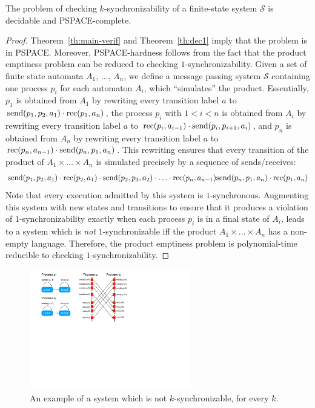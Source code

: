 \begin{theorem}
The problem of checking $k$-synchronizability of a finite-state system $\mathcal{S}$ is decidable and PSPACE-complete.
\end{theorem}
\begin{proof}
Theorem~\ref{th:main-verif} and Theorem~\ref{th:dec1} imply that the problem is in PSPACE. Moreover, PSPACE-hardness follows from the fact that the product emptiness problem can be reduced to checking $1$-synchronizability. Given a set of finite state automata $A_1$, $\ldots$, $A_n$, we define a message passing system $\mathcal{S}$ containing one process $p_i$ for each automaton $A_i$, which ``simulates'' the product. Essentially, $p_1$ is obtained from $A_1$ by rewriting every transition label $a$ to $\mathrm{send}({p_1,p_2,a_1})\cdot \mathrm{rec}({p_1,a_n})$, the process $p_i$ with $1<i<n$ is obtained from $A_i$ by rewriting every transition label $a$ to $\mathrm{rec}({p_i,a_{i-1}})\cdot \mathrm{send}({p_i,p_{i+1},a_i})$, and $p_n$ is obtained from $A_n$ by rewriting every transition label $a$ to $\mathrm{rec}({p_n,a_{n-1}})\cdot \mathrm{send}({p_n,p_1,a_n})$. This rewriting ensures that every transition of the product of $A_1\times\ldots\times A_n$ is simulated precisely by a sequence of sends/receives:
\begin{align*}
\mathrm{send}({p_1,p_2,a_1})\cdot \mathrm{rec}({p_2,a_1})\cdot \mathrm{send}({p_2,p_3,a_2})\cdot\ldots \cdot \mathrm{rec}({p_n,a_{n-1}}) \mathrm{send}({p_n,p_1,a_n})\cdot \mathrm{rec}({p_1,a_n})
\end{align*}
Note that every execution admitted by this system is $1$-synchronous. Augmenting this system with new states and transitions to ensure that it produces a violation of $1$-synchronizability exactly when each process $p_i$ is in a final state of $A_i$, leads to a system which is \emph{not} $1$-synchronizable iff the product $A_1\times\ldots\times A_n$ has a non-empty language. Therefore, the product emptiness problem is polynomial-time reducible to checking $1$-synchronizability.
\end{proof}

\begin{figure}
\includegraphics[width=7cm]{Ex-Decidability.pdf}
\caption{An example of a system which is not $k$-synchronizable, for every $k$.}
\label{fig:decid_ex}
\end{figure}

